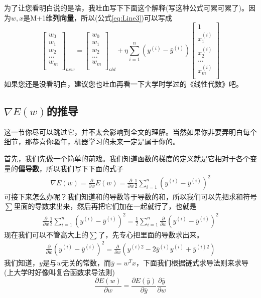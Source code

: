 为了让您看明白说的是啥，我吐血写下下面这个解释(写这种公式可累可累了)。因为{}\({w},{x}\)是M+1维\textbf{列向量}，所以(公式\ref{eq:Line3})可以写成
\begin{equation*}
	\begin{bmatrix}
		w_0 \\
		w_1 \\
		w_2 \\
		... \\
		w_m \\
	\end{bmatrix}_{new}=
	\begin{bmatrix}
		w_0 \\
		w_1 \\
		w_2 \\
		... \\
		w_m \\
	\end{bmatrix}_{old}+\eta\sum_{i=1}^{n}(y^{(i)}-\bar{y}^{(i)})
	\begin{bmatrix}
		1         \\
		x_1^{(i)} \\
		x_2^{(i)} \\
		...       \\
		x_m^{(i)} \\
	\end{bmatrix}
\end{equation*}
如果您还是没看明白，建议您也吐血再看一下大学时学过的《线性代数》吧。

\subsection{$\nabla{E}({w})$的推导}\label{Line:6}

这一节你尽可以跳过它，并不太会影响到全文的理解。当然如果你非要弄明白每个细节，那恭喜你骚年，机器学习的未来一定是属于你的。

首先，我们先做一个简单的前戏。我们知道函数的梯度的定义就是它相对于各个变量的\textbf{偏导数}，所以我们写下下面的式子
\begin{align*}
	\nabla{E({w})} =\frac{\partial}{\partial{w}}E({w}) =\frac{\partial}{\partial{w}}\frac{1}{2}\sum_{i=1}^{n}(y^{(i)}-\bar{y}^{(i)})^2
\end{align*}
可接下来怎么办呢？我们知道和的导数等于导数的和，所以我们可以先把求和符号\(\sum\)里面的导数求出来，然后再把它们加在一起就行了，也就是
\begin{align*}
	\frac{\partial}{\partial{w}}\frac{1}{2}\sum_{i=1}^{n}(y^{(i)}-\bar{y}^{(i)})^2 = \frac{1}{2}\sum_{i=1}^{n}\frac{\partial}{\partial{w}}(y^{(i)}-\bar{y}^{(i)})^2
\end{align*}
现在我们可以不管高大上的\(\sum\)了，先专心把里面的导数求出来。
\begin{align*}
	\frac{\partial}{\partial{w}}(y^{(i)}-\bar{y}^{(i)})^2 = \frac{\partial}{\partial{w}}(y^{(i)2}-2\bar{y}^{(i)}y^{(i)}+\bar{y}^{(i)2})
\end{align*}
我们知道，\(y\)是与\({w}\)无关的常数，而\(\bar{y}={w}^T{x}\)，下面我们根据链式求导法则来求导(上大学时好像叫复合函数求导法则)
\[
	\frac{\partial{E({w})}}{\partial{w}}=\frac{\partial{E(\bar{y})}}{\partial\bar{y}}\frac{\partial{\bar{y}}}{\partial{w}}
\]

